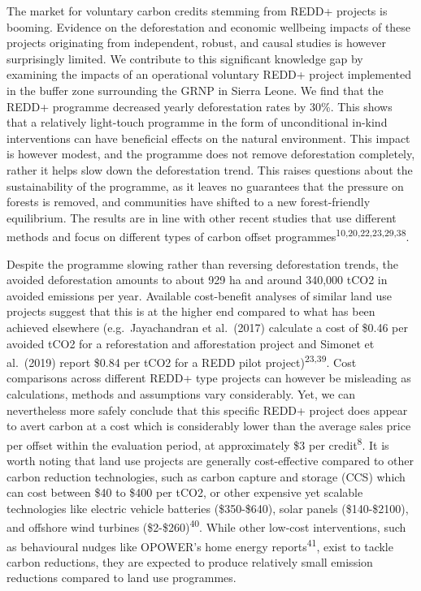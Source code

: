 \documentclass[
]{article}
\begin{document}
The market for voluntary carbon credits stemming from REDD+ projects is
booming. Evidence on the deforestation and economic wellbeing impacts of
these projects originating from independent, robust, and causal studies
is however surprisingly limited. We contribute to this significant
knowledge gap by examining the impacts of an operational voluntary REDD+
project implemented in the buffer zone surrounding the GRNP in Sierra
Leone. We find that the REDD+ programme decreased yearly deforestation
rates by 30\%. This shows that a relatively light-touch programme in the
form of unconditional in-kind interventions can have beneficial effects
on the natural environment. This impact is however modest, and the
programme does not remove deforestation completely, rather it helps slow
down the deforestation trend. This raises questions about the
sustainability of the programme, as it leaves no guarantees that the
pressure on forests is removed, and communities have shifted to a new
forest-friendly equilibrium. The results are in line with other recent
studies that use different methods and focus on different types of
carbon offset programmes\textsuperscript{10,20,22,23,29,38}.

Despite the programme slowing rather than reversing deforestation
trends, the avoided deforestation amounts to about 929 ha and around
340,000 tCO2 in avoided emissions per year. Available cost-benefit
analyses of similar land use projects suggest that this is at the higher
end compared to what has been achieved elsewhere (e.g.~Jayachandran et
al.~(2017) calculate a cost of \$0.46 per avoided tCO2 for a
reforestation and afforestation project and Simonet et al.~(2019) report
\$0.84 per tCO2 for a REDD pilot project)\textsuperscript{23,39}. Cost
comparisons across different REDD+ type projects can however be
misleading as calculations, methods and assumptions vary considerably.
Yet, we can nevertheless more safely conclude that this specific REDD+
project does appear to avert carbon at a cost which is considerably
lower than the average sales price per offset within the evaluation
period, at approximately \$3 per credit\textsuperscript{8}. It is worth
noting that land use projects are generally cost-effective compared to
other carbon reduction technologies, such as carbon capture and storage
(CCS) which can cost between \$40 to \$400 per tCO2, or other expensive
yet scalable technologies like electric vehicle batteries (\$350-\$640),
solar panels (\$140-\$2100), and offshore wind turbines
(\$2-\$260)\textsuperscript{40}. While other low-cost interventions,
such as behavioural nudges like OPOWER's home energy
reports\textsuperscript{41}, exist to tackle carbon reductions, they are
expected to produce relatively small emission reductions compared to
land use programmes.
\end{document}

